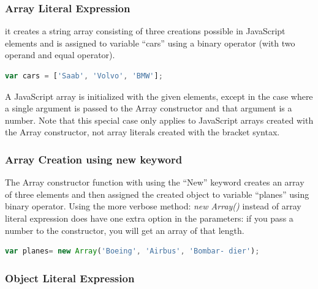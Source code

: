 \medskip
\noindent\subsubsection{Array Literal Expression}

it creates a string array consisting of three creations possible in JavaScript elements and is assigned to variable “cars” using a binary operator (with two operand and equal operator). 
\medskip
\begin{lstlisting}[caption={Array literal expression},label={lst:array_literal},language=JavaScript]
var cars = ['Saab', 'Volvo', 'BMW'];
\end{lstlisting}
A JavaScript array is initialized with the given elements, except in the case where a single argument is passed to the Array constructor and that argument is a number. Note that this special case only applies to JavaScript arrays created with the Array constructor, not array literals created with the bracket syntax.
\\
\noindent\subsubsection{Array Creation using \textbf{new} keyword}

The Array constructor function with using the “New” keyword creates an array of three elements and then assigned the created object to variable “planes” using binary operator. Using the more verbose method: \textit{new Array()} instead of array literal expression does have one extra option in the parameters: if you pass a number to the constructor, you will get an array of that length. 

\medskip
\begin{lstlisting}[caption={Array constructor},label={lst:array_constructor},language=JavaScript]
var planes= new Array('Boeing', 'Airbus', 'Bombar- dier');
\end{lstlisting}

\noindent\subsubsection{Object Literal Expression}


